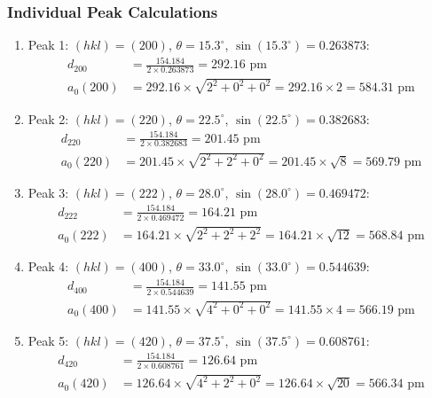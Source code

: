 \documentclass[12pt,a4paper]{article}
\begin{document}
\subsubsection{Individual Peak Calculations}
\begin{enumerate}
    \item Peak 1: $(hkl) = (200)$, $\theta = 15.3^\circ$, $\sin(15.3^\circ) = 0.263873$:
    \begin{align}
        d_{200} &= \frac{154.184}{2 \times 0.263873} = 292.16\text{ pm} \\
        a_{0}(200) &= 292.16 \times \sqrt{2^2 + 0^2 + 0^2} = 292.16 \times 2 = 584.31\text{ pm}
    \end{align}

    \item Peak 2: $(hkl) = (220)$, $\theta = 22.5^\circ$, $\sin(22.5^\circ) = 0.382683$:
    \begin{align}
        d_{220} &= \frac{154.184}{2 \times 0.382683} = 201.45\text{ pm} \\
        a_{0}(220) &= 201.45 \times \sqrt{2^2 + 2^2 + 0^2} = 201.45 \times \sqrt{8} = 569.79\text{ pm}
    \end{align}

    \item Peak 3: $(hkl) = (222)$, $\theta = 28.0^\circ$, $\sin(28.0^\circ) = 0.469472$:
    \begin{align}
        d_{222} &= \frac{154.184}{2 \times 0.469472} = 164.21\text{ pm} \\
        a_{0}(222) &= 164.21 \times \sqrt{2^2 + 2^2 + 2^2} = 164.21 \times \sqrt{12} = 568.84\text{ pm}
    \end{align}

    \item Peak 4: $(hkl) = (400)$, $\theta = 33.0^\circ$, $\sin(33.0^\circ) = 0.544639$:
    \begin{align}
        d_{400} &= \frac{154.184}{2 \times 0.544639} = 141.55\text{ pm} \\
        a_{0}(400) &= 141.55 \times \sqrt{4^2 + 0^2 + 0^2} = 141.55 \times 4 = 566.19\text{ pm}
    \end{align}

    \item Peak 5: $(hkl) = (420)$, $\theta = 37.5^\circ$, $\sin(37.5^\circ) = 0.608761$:
    \begin{align}
        d_{420} &= \frac{154.184}{2 \times 0.608761} = 126.64\text{ pm} \\
        a_{0}(420) &= 126.64 \times \sqrt{4^2 + 2^2 + 0^2} = 126.64 \times \sqrt{20} = 566.34\text{ pm}
    \end{align}
\end{enumerate}
\end{document}
